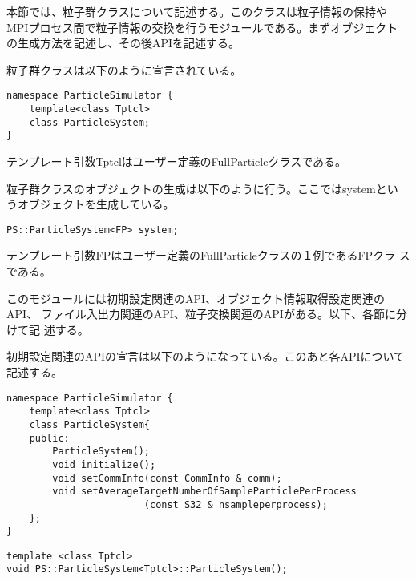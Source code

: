 本節では、粒子群クラスについて記述する。このクラスは粒子情報の保持や
MPIプロセス間で粒子情報の交換を行うモジュールである。まずオブジェクト
の生成方法を記述し、その後APIを記述する。


粒子群クラスは以下のように宣言されている。
\begin{lstlisting}[caption=ParticleSystem0]
namespace ParticleSimulator {
    template<class Tptcl>
    class ParticleSystem;
}
\end{lstlisting}
テンプレート引数Tptclはユーザー定義のFullParticleクラスである。

粒子群クラスのオブジェクトの生成は以下のように行う。ここではsystemとい
うオブジェクトを生成している。
\begin{screen}
\begin{verbatim}
PS::ParticleSystem<FP> system;
\end{verbatim}
\end{screen}
テンプレート引数FPはユーザー定義のFullParticleクラスの１例であるFPクラ
スである。


このモジュールには初期設定関連のAPI、オブジェクト情報取得設定関連のAPI、
ファイル入出力関連のAPI、粒子交換関連のAPIがある。以下、各節に分けて記
述する。


初期設定関連のAPIの宣言は以下のようになっている。このあと各APIについて
記述する。
\begin{lstlisting}[caption=ParticleSystem1]
namespace ParticleSimulator {
    template<class Tptcl>
    class ParticleSystem{
    public:
        ParticleSystem();
        void initialize();
        void setCommInfo(const CommInfo & comm);
        void setAverageTargetNumberOfSampleParticlePerProcess
                        (const S32 & nsampleperprocess);
    };
}
\end{lstlisting}



\begin{screen}
\begin{verbatim}
template <class Tptcl>
void PS::ParticleSystem<Tptcl>::ParticleSystem();
\end{verbatim}
\end{screen}

